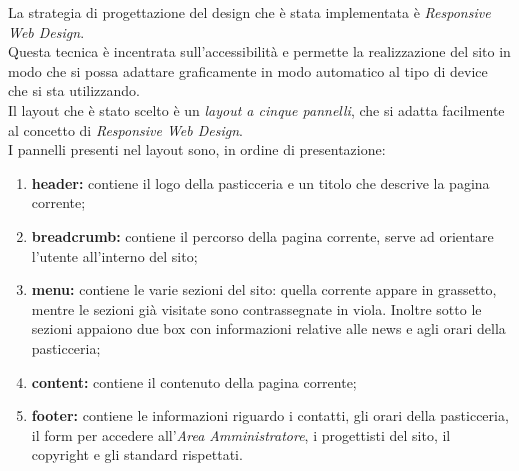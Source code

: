La strategia di progettazione del design che è stata implementata è \emph{Responsive Web Design}.\\
Questa tecnica è incentrata sull'accessibilità e permette la realizzazione del sito in modo che si possa adattare graficamente in modo automatico al tipo di device che si sta utilizzando.\\ 
Il layout che è stato scelto è un \emph{layout a cinque pannelli}, che si adatta facilmente al concetto di \emph{Responsive Web Design}.\\
I pannelli presenti nel layout sono, in ordine di presentazione:
\begin{enumerate}
	\item \textbf{header:} contiene il logo della pasticceria e un titolo che descrive la pagina corrente;
	\item \textbf{breadcrumb:} contiene il percorso della pagina corrente, serve ad orientare l'utente all'interno del sito;
	\item \textbf{menu:} contiene le varie sezioni del sito: quella corrente appare in grassetto, mentre le sezioni già visitate sono contrassegnate in viola. Inoltre sotto le sezioni appaiono due box con informazioni relative alle news e agli orari della pasticceria;
	\item \textbf{content:} contiene il contenuto della pagina corrente;
	\item \textbf{footer:} contiene le informazioni riguardo i contatti, gli orari della pasticceria, il form per accedere all'\emph{Area Amministratore}, i progettisti del sito, il copyright e gli standard rispettati.
\end{enumerate}

